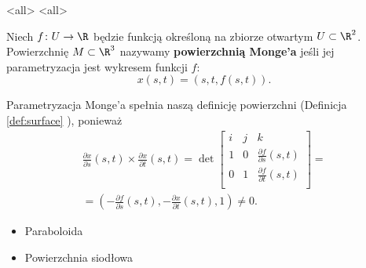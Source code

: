 \mode<all>{}
\mode<all>{}
\begin{frame}[<+->]


\begin{definicja}
Niech $f\colon U\to \R$ będzie funkcją określoną na zbiorze otwartym $U\subset \R^2$. Powierzchnię $M\subset \R^3$ nazywamy \textbf{powierzchnią Monge'a} jeśli jej parametryzacja jest wykresem funkcji $f$:
\[x(s,t)=(s,t,f(s,t)).\]
\begin{center}

\end{center}
\end{definicja}

\end{frame}
\begin{frame}[<+->]

\begin{uwaga}
Parametryzacja Monge'a spełnia naszą definicję powierzchni (Definicja \ref{def:surface} ), ponieważ 
\begin{multline*}
\frac{\partial x}{\partial s}(s,t)\times \frac{\partial x}{\partial t}(s,t)=\det 
\left[
\begin{array}{ccc}
i&j&k\\
1&0&\frac{\partial f}{\partial s}(s,t)\\
0&1&\frac{\partial f}{\partial t}(s,t)\\
\end{array}
\right]
=\\=\left(-\frac{\partial f}{\partial s}(s,t),-\frac{\partial x}{\partial t}(s,t),1\right)\neq 0.\end{multline*}

\end{uwaga}
\end{frame}
\begin{frame}[<+->]

\begin{przyklad}
\begin{itemize}
\item Paraboloida
\item Powierzchnia siodłowa
\begin{center}

\end{center}

\end{itemize}

\end{przyklad}

\end{frame}

